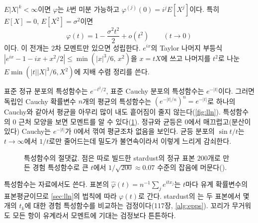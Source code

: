 $E|X|^k<\infty$이면 $\varphi$는 $k$번 미분 가능하고 $\varphi^{(j)}(0)=i^jE[X^j]$이다. 특히 $E[X]=0$, $E[X^2]=\sigma^2$이면
\begin{equation}
\label{eq:cf-taylor}
\varphi(t)=1-\frac{\sigma^2t^2}2+o(t^2)\qquad(t\to0)
\end{equation}
이다. 이 전개는 $2$차 모멘트만 있으면 성립한다. $e^{ix}$의 Taylor 나머지 부등식 $|e^{ix}-1-ix+x^2/2|\le\min(|x|^3/6,\,x^2)$을 $x=tX$에 쓰고 나머지를 $t^2$로 나눈 $E\min(|t||X|^3/6,X^2)$에 지배 수렴 정리를 쓴다.

표준 정규 분포의 특성함수는 $e^{-t^2/2}$, 표준 Cauchy 분포의 특성함수는 $e^{-|t|}$이다. 그러면 독립인 Cauchy 확률변수 $n$개의 평균의 특성함수는 $(e^{-|t|/n})^n=e^{-|t|}$로 하나의 Cauchy와 같아서 평균을 아무리 많이 내도 흩어짐이 줄지 않는다(\cref{fig:lln}). 특성함수의 $0$ 근처 모양을 보면 모멘트를 알 수 있다(\cref{fig:cf}). 정규와 균등은 $0$에서 매끄럽고(분산이 있다) Cauchy는 $e^{-|t|}$가 $0$에서 꺾여 평균조차 없음을 보인다. 균등 분포의 $\sin t/t$는 $t\to\infty$에서 $1/t$로만 줄어드는데 밀도가 불연속이라서 이렇게 느리게 감쇠한다.

\begin{figure}[htbp]
\centering
{}
\caption{특성함수의 절댓값. 점은 따로 빌드한 stardust의 정규 표본 $200$개로 만든 경험 특성함수로 큰 $t$에서 $1/\sqrt{200}\approx0.07$ 수준의 잡음에 머문다().}
\label{fig:cf}
\end{figure}

특성함수는 자료에서도 쓴다. 표본의  $\hat\varphi(t)=n^{-1}\sum_je^{itx_j}$는 $t$마다 유계 확률변수의 표본평균이므로 \cref{sec:lln}의 법칙에 따라 $\varphi(t)$로 간다. stardust의 는 두 표본에서 몇 개의 $t_k$에 대한 경험 특성함수를 비교하는 검정이다(117장, \cref{alg:epps}). 꼬리가 무거워도 모든 항이 유계라서 모멘트에 기대는 검정보다 튼튼하다.


